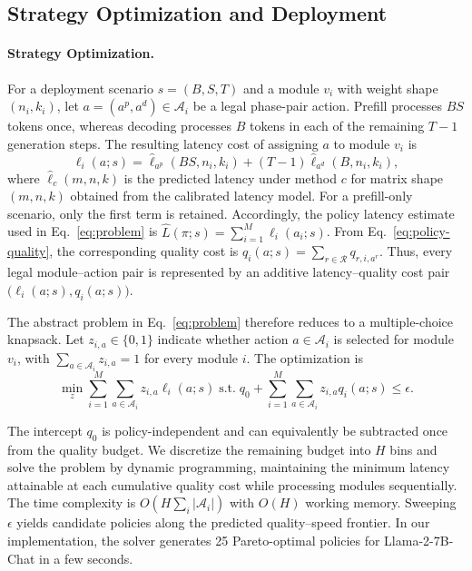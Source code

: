 \documentclass[letterpaper]{article} %
\begin{document}
\subsection{Strategy Optimization and Deployment}

\paragraph{Strategy Optimization.}
For a deployment scenario $s=(B,S,T)$ and a module $v_i$ with weight shape $(n_i,k_i)$, let $a=(a^p,a^d)\in\mathcal{A}_i$ be a legal phase-pair action. Prefill processes $BS$ tokens once, whereas decoding processes $B$ tokens in each of the remaining $T-1$ generation steps. The resulting latency cost of assigning $a$ to module $v_i$ is
\begin{equation}
\ell_i(a;s)
=
\widehat{\ell}_{a^p}(BS,n_i,k_i)
+
(T-1)\widehat{\ell}_{a^d}(B,n_i,k_i),
\end{equation}
where $\widehat{\ell}_c(m,n,k)$ is the predicted latency under method $c$ for matrix shape $(m,n,k)$ obtained from the calibrated latency model. For a prefill-only scenario, only the first term is retained. Accordingly, the policy latency estimate used in Eq.~\ref{eq:problem} is $\widehat{L}(\pi;s)=\sum_{i=1}^{M}\ell_i(a_i;s)$. From Eq.~\ref{eq:policy-quality}, the corresponding quality cost is $q_i(a;s)=\sum_{r\in\mathcal{R}}q_{r,i,a^r}$. Thus, every legal module--action pair is represented by an additive latency--quality cost pair $\bigl(\ell_i(a;s),q_i(a;s)\bigr)$.

The abstract problem in Eq.~\ref{eq:problem} therefore reduces to a multiple-choice knapsack. Let $z_{i,a}\in\{0,1\}$ indicate whether action $a\in\mathcal{A}_i$ is selected for module $v_i$, with $\sum_{a\in\mathcal{A}_i}z_{i,a}=1$ for every module $i$. The optimization is
\begin{equation}
\min_z \sum_{i=1}^{M}\sum_{a\in\mathcal{A}_i}z_{i,a}\ell_i(a;s)
\;\mathrm{s.t.}\;
q_0+\sum_{i=1}^{M}\sum_{a\in\mathcal{A}_i}z_{i,a}q_i(a;s)\leq\epsilon.
\label{eq:knapsack}
\end{equation}

The intercept $q_0$ is policy-independent and can equivalently be subtracted once from the quality budget. We discretize the remaining budget into $H$ bins and solve the problem by dynamic programming, maintaining the minimum latency attainable at each cumulative quality cost while processing modules sequentially. The time complexity is $O\!\left(H\sum_i|\mathcal{A}_i|\right)$ with $O(H)$ working memory. Sweeping $\epsilon$ yields candidate policies along the predicted quality--speed frontier. In our implementation, the solver generates 25 Pareto-optimal policies for Llama-2-7B-Chat in a few seconds.
\end{document}
